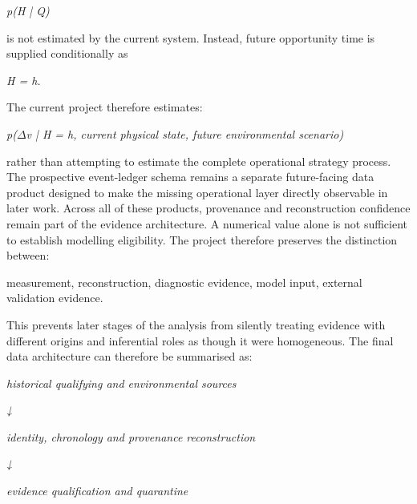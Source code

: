 \begin{center}\textit{p(H | Q)}\end{center}

is not estimated by the current system. Instead, future opportunity time is supplied conditionally as

\begin{center}\textit{H = h.}\end{center}

The current project therefore estimates:

\begin{center}\textit{p(\ensuremath{\Delta}v | H = h, current physical state, future environmental scenario)}\end{center}

rather than attempting to estimate the complete operational strategy process. The prospective event-ledger schema remains a separate future-facing data product designed to make the missing operational layer directly observable in later work. Across all of these products, provenance and reconstruction confidence remain part of the evidence architecture. A numerical value alone is not sufficient to establish modelling eligibility. The project therefore preserves the distinction between:

measurement, reconstruction, diagnostic evidence, model input, external validation evidence.

This prevents later stages of the analysis from silently treating evidence with different origins and inferential roles as though it were homogeneous. The final data architecture can therefore be summarised as:

\begin{center}\textit{historical qualifying and environmental sources}\end{center}

\begin{center}\textit{↓}\end{center}

\begin{center}\textit{identity, chronology and provenance reconstruction}\end{center}

\begin{center}\textit{↓}\end{center}

\begin{center}\textit{evidence qualification and quarantine}\end{center}

